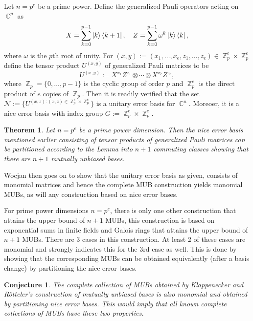 \documentclass[a4paper]{article}
\DeclareMathOperator{\C}{\mathbb{C}}
\DeclareMathOperator{\Z}{\mathbb{Z}}
\newtheorem{theorem}{Theorem}
\newtheorem{conjecture}{Conjecture}
\begin{document}
  Let $n = p^{e}$ be a prime power. Define the generalized
  Pauli operators acting on $\C^{p}$ as
  \[
    X = \sum_{k=0}^{p-1} \ket k \bra{k+1},
    \quad
    Z = \sum_{k=0}^{p-1} \omega^{k} \ket k \bra k,
  \] 
  where $\omega$ is the $p$th root of unity. For $(x,y) :=
  (x_1,\ldots,x_e,z_1,\ldots,z_e) \in \Z_p^e \times \Z_p^e$ 
  define the tensor product $U^{(x,y)}$ of generalized Pauli
  matrices to be 
  \[
    U^{(x,y)}
    := X^{x_1} Z^{z_1} \otimes \cdots \otimes X^{x_e}
    Z^{z_e},
  \] 
  where $\Z_p = \{0,\ldots,p-1\}$ is the cyclic group of
  order $p$ and $\Z_p^e$ is the direct product of $e$ copies
  of $\Z_p$. Then it is readily verified that the set
  $\mathcal{N} := \{U^{(x,z) : (x,z) \in \Z_p^e \times
  \Z_p^e}\}$ is a unitary error basis for $\C^{n}$. Moreoer,
  it is a nice error basis with index group $G := \Z_p^e
  \times \Z_p^e$.

  \begin{theorem}
    Let $n = p^{e}$ be a prime power dimension. Then the
    nice error basis mentioned earlier consisting of tensor
    products of generalized Pauli matrices can be
    partitioned according to the Lemma into $n+1$ commuting
    classes showing that there are $n+1$ mutually unbiased
    bases.
  \end{theorem}

  Wocjan then goes on to show that the unitary error basis
  as given, consists of monomial matrices and hence the
  complete MUB construction yields monomial MUBs, as will
  any construction based on nice error bases.

  For prime power dimensions $n = p^{e}$, there is only one
  other construction that attains the upper bound of $n+1$ 
  MUBs, this construction is based on exponential sums in
  finite fields and Galois rings that attains the upper
  bound of $n+1$ MUBs. There are 3 cases in this
  construction. At least 2 of these cases are monomial and
  strongly indicates this for the 3rd case as well. This is
  done by showing that the corresponding MUBs can be
  obtained equivalently (after a basis change) by
  partitioning the nice error bases. 

  \begin{conjecture}
    The complete collection of MUBs obtained by Klappenecker
    and Rötteler's construction of mutually unbiased bases
    is also monomial and obtained by partitioning nice error
    bases. This would imply that all known complete
    collections of MUBs have these two properties.
  \end{conjecture}
\end{document}
